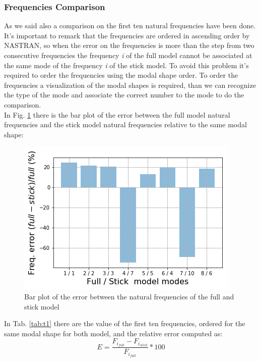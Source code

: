 \subsubsection{Frequencies Comparison}
As we said also a comparison on the first ten natural frequencies have been done. It's important to remark that the frequencies are ordered in ascending order by NASTRAN, so when the error on the frequencies is more than the step from two consecutive frequencies the frequency \textit{i} of the full model cannot be associated at the same mode of the frequency \textit{i} of the stick model. To avoid this problem it's required to order the frequencies using the modal shape order. To order the frequencies a visualization of the modal shapes is required, than we can recognize the type of the mode and associate the correct number to the mode to do the comparison.\\
In Fig. \ref{fig:4_9} there is the bar plot of the error between the full model natural frequencies and the stick model natural frequencies relative to the same modal shape:
\begin{figure}[H]
	\centering
	\includegraphics[width = .8\textwidth]{./Immagini/4_14.png}
	\caption{Bar plot of the error between the natural frequencies of the full and stick model}
	\label{fig:4_9}
\end{figure}
In Tab. \ref{tab:t1} there are the value of the first ten frequencies, ordered for the same modal shape for both model, and the relative error computed as:
\begin{equation*}
E= \frac{F_{i_{full}}- F_{i_{stick}}}{F_{i_{full}}}* 100
\end{equation*}
